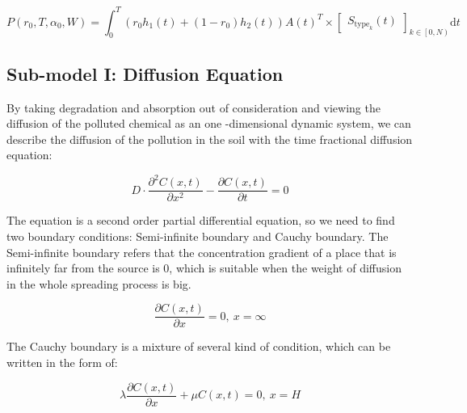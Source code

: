 \documentclass[./main.tex]{subfiles}
\begin{document}
        \begin{equation}
            \label{eq:itp}
            P\left(r_0,T,\alpha_0,W\right)=\int_0^T\left(r_0 h_1\left(t\right)+\left(1-r_0\right)h_2
            \left(t\right)\right){A
            \left(t\right)}^T\times
            \begin{bmatrix}
                S_{\mathrm{type}_k}\left(t\right)
            \end{bmatrix}_{k\in \left[0,N\right)}
            \mathrm{d}t
        \end{equation}

    \subsection{Sub-model I: Diffusion Equation}
        By taking degradation and absorption out of consideration and viewing the diffusion of the polluted chemical
        as an one -dimensional dynamic system, we can describe the diffusion of the pollution in the soil with the time fractional diffusion equation:

        \begin{equation}
            \label{eq:tfd}
            D\cdot \frac{\partial^2 C\left(x, t \right)}{\partial x^2} - \frac{\partial C\left( x, t
            \right)}{\partial t} = 0
        \end{equation}

        The equation is a second order partial differential equation, so we need to find two boundary conditions:
        Semi-infinite boundary and Cauchy boundary.
        The Semi-infinite boundary refers that the concentration gradient of a place that is infinitely far from the source
        is $0$, which is suitable when the weight of diffusion in the whole spreading process is big.

        \begin{equation}
            \label{eq:sib}
            \frac{\partial C\left(x, t\right)}{\partial x} = 0,\ x = \infty
        \end{equation}

        The Cauchy boundary is a mixture of several kind of condition, which can be written in the form of:

        \begin{equation}
            \label{eq:cb}
            \lambda \frac{\partial C\left(x, t\right)}{\partial x} + \mu C\left(x, t\right) = 0,\ x = H
        \end{equation}
\end{document}
